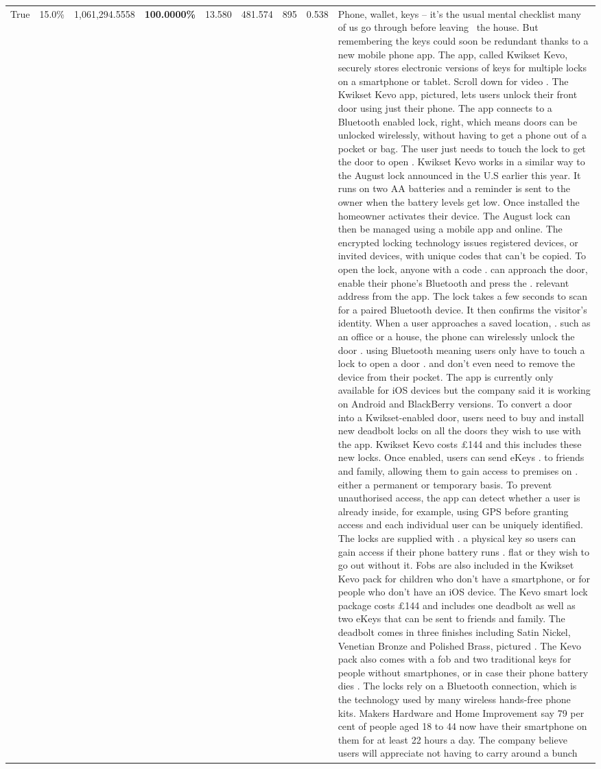 \begin{table}[H]
\begin{tabular}{lllrlllll}
True & 15.0\% & 1,061,294.5558 & \bfseries \color{red} 100.0000\% & 13.580 & 481.574 & 895 & 0.538 & Phone, wallet, keys – it’s the usual mental checklist many of us go through before leaving  the house. But remembering the keys could soon be redundant thanks to a new mobile phone app. The app, called Kwikset Kevo, securely stores electronic versions of keys for multiple locks on a smartphone or tablet. Scroll down for video . The Kwikset Kevo app, pictured, lets users unlock their front door using just their phone. The app connects to a Bluetooth enabled lock, right, which means doors can be unlocked wirelessly, without having to get a phone out of a pocket or bag. The user just needs to touch the lock to get the door to open . Kwikset Kevo works in a similar way to the August lock announced in the U.S earlier this year. It runs on two AA batteries and a reminder is sent to the owner when the battery levels get low. Once installed the homeowner activates their device. The August lock can then be managed using a mobile app and online. The encrypted locking technology issues registered devices, or invited devices, with unique codes that can't be copied. To open the lock, anyone with a code . can approach the door, enable their phone's Bluetooth and press the . relevant address from the app. The lock takes a few seconds to scan for a paired Bluetooth device. It then confirms the visitor's identity. When a user approaches a saved location, . such as an office or a house, the phone can wirelessly unlock the door . using Bluetooth meaning users only have to touch a lock to open a door . and don't even need to remove the device from their pocket. The app is currently only available for iOS devices but the company said it is working on Android and BlackBerry versions. To convert a door into a Kwikset-enabled door, users need to buy and install new deadbolt locks on all the doors they wish to use with the app. Kwikset Kevo costs £144 and this includes these new locks. Once enabled, users can send eKeys . to friends and family, allowing them to gain access to premises on . either a permanent or temporary basis. To prevent unauthorised access, the app can detect whether a user is already inside, for example, using GPS before granting access and each individual user can be uniquely identified. The locks are supplied with . a physical key so users can gain access if their phone battery runs . flat or they wish to go out without it. Fobs are also included in the Kwikset Kevo pack for children who don't have a smartphone, or for people who don't have an iOS device. The Kevo smart lock package costs £144 and includes one deadbolt as well as two eKeys that can be sent to friends and family. The deadbolt comes in three finishes including Satin Nickel, Venetian Bronze and Polished Brass, pictured . The Kevo pack also comes with a fob and two traditional keys for people without smartphones, or in case their phone battery dies . The locks rely on a Bluetooth connection, which is the technology used by many wireless hands-free phone kits. Makers Hardware and Home Improvement say 79 per cent of people aged 18 to 44 now have their smartphone on them for at least 22 hours a day. The company believe users will appreciate not having to carry around a bunch 
\end{tabular}
\end{table}
